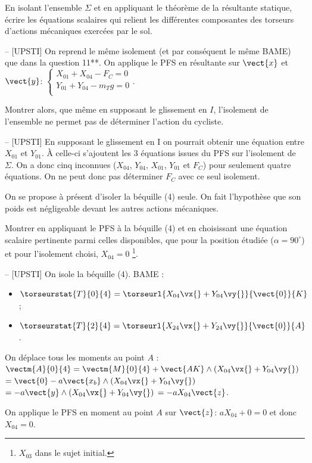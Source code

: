 \begin{question}En isolant l'ensemble \(\Sigma\) et en appliquant le théorème de la résultante statique, écrire les équations scalaires qui relient les différentes composantes des torseurs d'actions mécaniques exercées par le sol.
\end{question}
\ifprof
\begin{corrige}-- [UPSTI]
On reprend le même isolement (et par conséquent le même BAME) que dans la question 11**.
On applique le PFS en résultante sur $\vect{x}$ et $\vect{y}$:
$\left\{
\begin{array}{l}
X_{01}+X_{04}-F_C=0 \\
Y_{01}+Y_{04}-m_T g=0 \\
\end{array}
\right.
$.

\end{corrige}
\else
\fi

\begin{question}Montrer alors, que même en supposant le glissement en \(I\), l'isolement de l'ensemble ne permet pas de déterminer l'action du cycliste.
\end{question}
\ifprof
\begin{corrige}-- [UPSTI]
En supposant le glissement en I on pourrait obtenir une équation entre $X_{01}$ et $Y_{01}$. À celle-ci s’ajoutent les 3 équations issues du PFS sur l’isolement de $\Sigma$. On a donc cinq inconnues ($X_{04}$, $Y_{04}$, $X_{01}$, $Y_{01}$ et $F_C$) pour seulement quatre équations. On ne peut donc pas déterminer $F_C$ avec ce seul isolement.
\end{corrige}
\else
\fi

On se propose à présent d'isoler la béquille (4) seule. On fait l'hypothèse que son poids est négligeable devant les autres actions mécaniques.

\begin{question}Montrer en appliquant le PFS à la béquille (4) et en choisissant une équation scalaire pertinente parmi celles disponibles, que pour la position étudiée (\(\alpha=90^{\circ}\)) et pour l'isolement choisi, \(X_{04}=0\) \footnote{$X_{03}$ dans le sujet initial.}.
\end{question}
\ifprof
\begin{corrige}-- [UPSTI]
On isole la béquille (4).
BAME :
\begin{itemize}
\item $\torseurstat{T}{0}{4} = \torseurl{X_{04}\vx{}+Y_{04}\vy{}}{\vect{0}}{K}$;
\item $\torseurstat{T}{2}{4}= \torseurl{X_{24}\vx{}+Y_{24}\vy{}}{\vect{0}}{A}$.
\end{itemize}
 
On déplace tous les moments au point $A$ :
$\vectm{A}{0}{4}=\vectm{M}{0}{4}+\vect{AK}\wedge \left(X_{04}\vx{}+Y_{04}\vy{}\right)$
$=\vect{0}  - a \vect{x_b} \wedge \left(X_{04}\vx{}+Y_{04}\vy{}\right)$
$=- a \vect{y} \wedge \left(X_{04}\vx{}+Y_{04}\vy{}\right)$
$=-aX_{04} \vect{z}$.

On applique le PFS en moment au point 
$A$ sur 
$\vect{z}$: 
$aX_{04}+0=0$ et donc 
$X_{04}=0$.

\end{corrige}
\else
\fi

